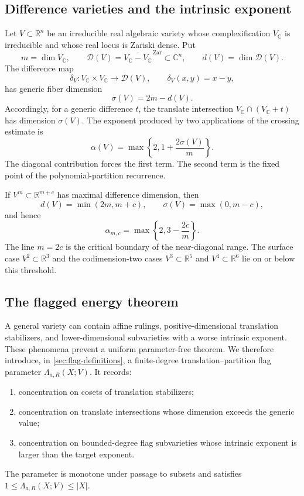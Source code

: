 \documentclass[11pt]{amsart}
\numberwithin{equation}{section}
\theoremstyle{definition}
\theoremstyle{remark}
\newcommand{\R}{\mathbb R}
\newcommand{\C}{\mathbb C}
\newcommand{\cD}{\mathcal D}
\newcommand{\1}{\mathbf 1}
\newcommand{\card}[1]{\lvert #1\rvert}
\begin{document}
\subsection{Difference varieties and the intrinsic exponent}
Let $V\subset\R^n$ be an irreducible real algebraic variety whose complexification $V_{\C}$ is irreducible and whose real locus is Zariski dense.  Put
\[
 m=\dim V_{\C},
 \qquad
 \cD(V)=\overline{V_{\C}-V_{\C}}^{\,\mathrm{Zar}}\subset\C^n,
 \qquad
 d(V)=\dim\cD(V).
\]
The difference map
\[
 \delta_V:V_{\C}\times V_{\C}\longrightarrow \cD(V),
 \qquad
 \delta_V(x,y)=x-y,
\]
has generic fiber dimension
\begin{equation}\label{eq:sigma-intro}
 \sigma(V)=2m-d(V).
\end{equation}
Accordingly, for a generic difference $t$, the translate intersection $V_{\C}\cap(V_{\C}+t)$ has dimension $\sigma(V)$.  The exponent produced by two applications of the crossing estimate is
\begin{equation}\label{eq:alpha-intro}
 \alpha(V)=\max\left\{2,1+\frac{2\sigma(V)}m\right\}.
\end{equation}
The diagonal contribution forces the first term.  The second term is the fixed point of the polynomial-partition recurrence.

If $V^m\subset\R^{m+c}$ has maximal difference dimension, then
\[
 d(V)=\min(2m,m+c),
 \qquad
 \sigma(V)=\max(0,m-c),
\]
and hence
\begin{equation}\label{eq:mc-intro}
 \alpha_{m,c}=\max\left\{2,3-\frac{2c}{m}\right\}.
\end{equation}
The line $m=2c$ is the critical boundary of the near-diagonal range.  The surface case $V^2\subset\R^3$ and the codimension-two cases $V^3\subset\R^5$ and $V^4\subset\R^6$ lie on or below this threshold.

\subsection{The flagged energy theorem}
A general variety can contain affine rulings, positive-dimensional translation stabilizers, and lower-dimensional subvarieties with a worse intrinsic exponent.  These phenomena prevent a uniform parameter-free theorem.  We therefore introduce, in \cref{sec:flag-definitions}, a finite-degree translation--partition flag parameter $\Lambda_{a,R}(X;V)$.  It records:
\begin{enumerate}[label=(\roman*)]
 \item concentration on cosets of translation stabilizers;
 \item concentration on translate intersections whose dimension exceeds the generic value;
 \item concentration on bounded-degree flag subvarieties whose intrinsic exponent is larger than the target exponent.
\end{enumerate}
The parameter is monotone under passage to subsets and satisfies $1\leq\Lambda_{a,R}(X;V)\leq\card X$.
\end{document}
